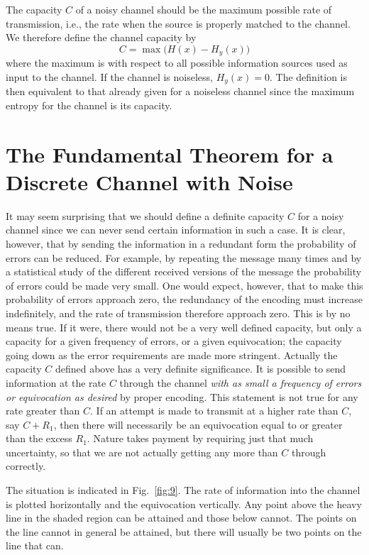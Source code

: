 The capacity $C$ of a noisy channel should be the maximum possible rate
of transmission, i.e., the rate when the source is properly matched to
the channel.  We therefore define the channel capacity by
$$
C= \max \bigl(H(x) - H_y(x)\bigr)
$$
where the maximum is with respect to all possible information sources
used as input to the channel.  If the channel is noiseless, $H_y(x) = 0$.
The definition is then equivalent to that already given for a noiseless
channel since the maximum entropy for the channel is its capacity.

\section{The Fundamental Theorem for a Discrete Channel with Noise}

It may seem surprising that we should define a definite capacity $C$
for a noisy channel since we can never send certain information in such
a case.  It is clear, however, that by sending the information in a
redundant form the probability of errors can be reduced.  For example,
by repeating the message many times and by a statistical study of the
different received versions of the message the probability of errors
could be made very small.  One would expect, however, that to make this
probability of errors approach zero, the redundancy of the encoding
must increase indefinitely, and the rate of transmission therefore
approach zero.  This is by no means true.  If it were, there would
not be a very well defined capacity, but only a capacity for a given
frequency of errors, or a given equivocation; the capacity going down as
the error requirements are made more stringent.  Actually the capacity
$C$ defined above has a very definite significance.  It is possible to
send information at the rate $C$ through the channel \emph{with as small
a frequency of errors or equivocation as desired} by proper encoding.
This statement is not true for any rate greater than $C$.  If an attempt
is made to transmit at a higher rate than $C$, say $C+R_1$, then there
will necessarily be an equivocation equal to or greater than the excess
$R_1$.  Nature takes payment by requiring just that much uncertainty,
so that we are not actually getting any more than $C$ through correctly.

The situation is indicated in Fig.~\ref{fig:9}.  The rate of information
into the channel is plotted horizontally and the equivocation vertically.
Any point above the heavy line in the shaded region can be attained and
those below cannot.  The points on the line cannot in general be attained,
but there will usually be two points on the line that can.

